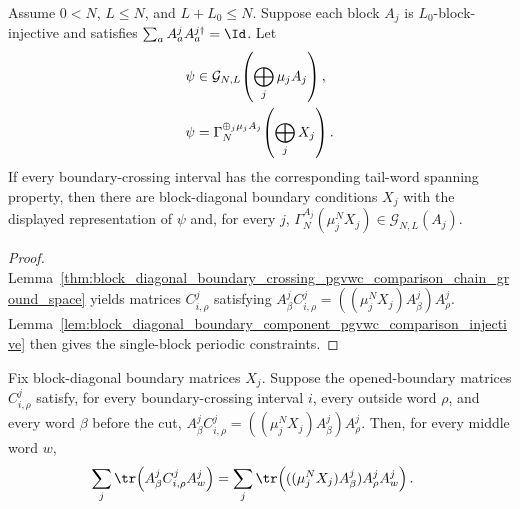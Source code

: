 \begin{lemma}
    \label{lem:block_diagonal_boundary_periodic_components_from_crossing_boundary}
    \leanok
    Assume $0<N$, $L\le N$, and $L+L_0\le N$. Suppose each block $A_j$
    is $L_0$-block-injective and satisfies
    $\sum_a A^j_aA^{j\dagger}_a=\Id$. Let
    \begin{align}
        \psi
         & \in
        \mathcal G_{N,L}\!\left(\bigoplus_j\mu_jA_j\right),
        \notag \\
        \psi
         & =
        \Gamma_N^{\oplus_j\mu_jA_j}\!\left(\bigoplus_jX_j\right).
        \notag
    \end{align}
    If every boundary-crossing interval has the corresponding tail-word
    spanning property, then there are block-diagonal boundary conditions $X_j$
    with the displayed representation of $\psi$ and, for every $j$,
    $\Gamma_N^{A_j}(\mu_j^NX_j) \in \mathcal G_{N,L}(A_j)$.
\end{lemma}

\begin{proof}
    \leanok
    Lemma~\ref{thm:block_diagonal_boundary_crossing_pgvwc_comparison_chain_ground_space}
    yields matrices $C^j_{i,\rho}$ satisfying
    $A^j_\beta C^j_{i,\rho} = ((\mu_j^NX_j)A^j_\beta)A^j_\rho$.
    Lemma~\ref{lem:block_diagonal_boundary_component_pgvwc_comparison_injective}
    then gives the single-block periodic constraints.
\end{proof}

\begin{lemma}
    \label{lem:block_diagonal_boundary_trace_decomposition_from_pgvwc_comparison}
    \leanok
    Fix block-diagonal boundary matrices $X_j$. Suppose the opened-boundary
    matrices $C^j_{i,\rho}$ satisfy, for every boundary-crossing interval $i$,
    every outside word $\rho$, and every word $\beta$ before the cut,
    $A^j_\beta C^j_{i,\rho} = ((\mu_j^NX_j)A^j_\beta)A^j_\rho$.
    Then, for every middle word $w$,
    \begin{align}
        \sum_j\tr\!\left(A^j_\beta C^j_{i,\rho}A^j_w\right)
         & =
        \sum_j
        \tr\!\left(((\mu_j^NX_j)A^j_\beta)A^j_\rho A^j_w\right).
        \notag
    \end{align}
\end{lemma}

